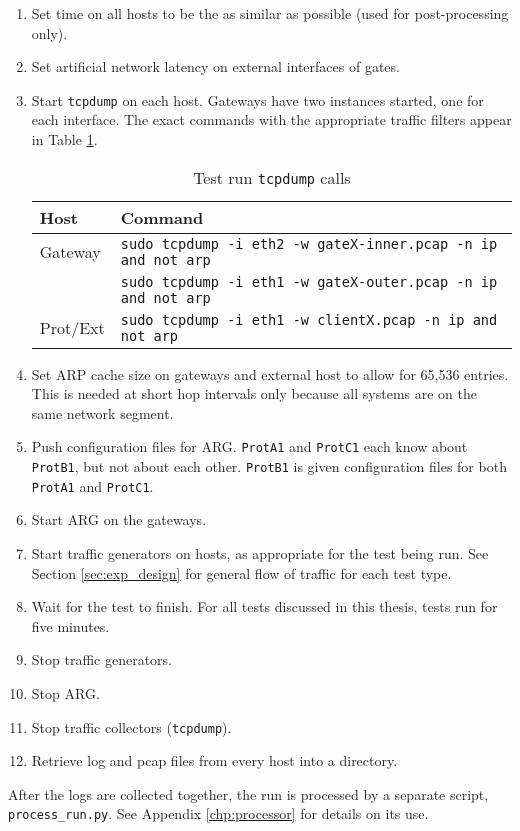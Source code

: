 \begin{enumerate}
\item Set time on all hosts to be the as similar as possible (used for post-processing only).
\item Set artificial network latency on external interfaces of gates.
\item Start \texttt{tcpdump} on each host. Gateways have two instances started, one for each interface. The exact commands with the appropriate traffic filters appear in Table \ref{tbl:test_tcpdump_calls}.
\begin{table}
\caption{Test run \texttt{tcpdump} calls}
\label{tbl:test_tcpdump_calls}
\centering
\begin{tabular}{l|l}
\textbf{Host} & \textbf{Command}\\
\hline
Gateway & \texttt{sudo tcpdump -i eth2 -w gateX-inner.pcap -n ip and not arp}\\
	& \texttt{sudo tcpdump -i eth1 -w gateX-outer.pcap -n ip and not arp}\\
\hline
Prot/Ext & \texttt{sudo tcpdump -i eth1 -w clientX.pcap -n ip and not arp}
\end{tabular}
\end{table}

\item Set \ac{ARP} cache size on gateways and external host to allow for 65,536 entries. This is needed at short hop intervals only because all systems are on the same network segment.
\item Push configuration files for \ac{ARG}. \texttt{ProtA1} and \texttt{ProtC1} each know about \texttt{ProtB1}, but not about each other. \texttt{ProtB1} is given configuration files for both \texttt{ProtA1} and \texttt{ProtC1}.
\item Start \ac{ARG} on the gateways. 
\item Start traffic generators on hosts, as appropriate for the test being run. See Section \ref{sec:exp_design} for general flow of traffic for each test type.
\item Wait for the test to finish. For all tests discussed in this thesis, tests run for five minutes.
\item Stop traffic generators.
\item Stop \ac{ARG}.
\item Stop traffic collectors (\texttt{tcpdump}).
\item Retrieve log and pcap files from every host into a directory.
\end{enumerate}

\par After the logs are collected together, the run is processed by a separate script, \texttt{process\_run.py}. See Appendix \ref{chp:processor} for details on its use. 

